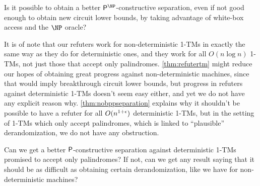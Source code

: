 \begin{question}
Is it possible to obtain a better $\PTIME^\NP$-constructive separation, even if not good enough to obtain new circuit lower
bounds, by taking advantage of white-box access and the $\NP$ oracle?
\end{question}

It is of note that our refuters work for non-deterministic 1-TMs in exactly the same way as they do for deterministic ones,
and they work for all $O(n \log n)$ 1-TMs, not just those that accept only palindromes. 
\cref{thm:refutertm} might reduce our hopes of obtaining great progress against non-deterministic machines, 
since that would imply breakthrough circuit lower bounds, but progress in refuters against deterministic 1-TMs doesn't seem
easy either, and yet we do not have any explicit reason why. \cref{thm:nobppseparation} explains why it shouldn't be possible
to have a refuter for all $O(n^{1+\epsilon})$ deterministic 1-TMs, but in the setting of 1-TMs which only accept palindromes,
which is linked to ``plausible'' derandomization, we do not have any obstruction. 

\begin{question}
Can we get a better $\mathsf{P}$-constructive separation against deterministic 1-TMs promised to accept only 
palindromes? If not, can we get any result saying that it should be as difficult as obtaining certain derandomization,
like we have for non-deterministic machines?
\end{question}



